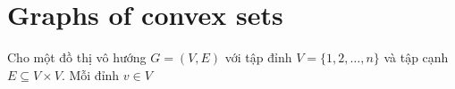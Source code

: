 \section{Graphs of convex sets}
Cho một đồ thị vô hướng $G = (V, E)$ với tập đỉnh $V = \{1, 2, \ldots, n\}$ và tập cạnh $E \subseteq V \times V$. Mỗi đỉnh $v \in V$ 